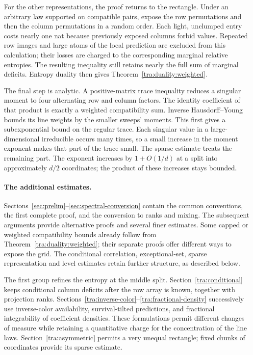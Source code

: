 For the other representations, the proof returns to the rectangle. Under an arbitrary law supported on compatible pairs, expose the row permutations and then the column permutations in a random order. Each light, unclumped entry costs nearly one nat because previously exposed columns forbid values. Repeated row images and large atoms of the local prediction are excluded from this calculation; their losses are charged to the corresponding marginal relative entropies. The resulting inequality still retains nearly the full sum of marginal deficits. Entropy duality then gives Theorem~\ref{tra:duality:weighted}.

The final step is analytic. A positive-matrix trace inequality reduces a singular moment to four alternating row and column factors. The identity coefficient of that product is exactly a weighted compatibility sum. Inverse Hausdorff--Young bounds its line weights by the smaller sweeps' moments. This first gives a subexponential bound on the regular trace. Each singular value in a large-dimensional irreducible occurs many times, so a small increase in the moment exponent makes that part of the trace small. The sparse estimate treats the remaining part. The exponent increases by $1+O(1/d)$ at a split into approximately $d/2$ coordinates; the product of these increases stays bounded.

\paragraph{The additional estimates.}
Sections~\ref{sec:prelim}--\ref{sec:spectral-conversion} contain the common conventions, the first complete proof, and the conversion to ranks and mixing. The subsequent arguments provide alternative proofs and several finer estimates. Some capped or weighted compatibility bounds already follow from Theorem~\ref{tra:duality:weighted}; their separate proofs offer different ways to expose the grid. The conditional correlation, exceptional-set, sparse representation and level estimates retain further structure, as described below.

The first group refines the entropy at the middle split. Section~\ref{tra:conditional} keeps conditional column deficits after the row array is known, together with projection ranks. Sections~\ref{tra:inverse-color}--\ref{tra:fractional-density} successively use inverse-color availability, survival-tilted predictions, and fractional integrability of coefficient densities. These formulations permit different changes of measure while retaining a quantitative charge for the concentration of the line laws. Section~\ref{tra:asymmetric} permits a very unequal rectangle; fixed chunks of coordinates provide its sparse estimate.

